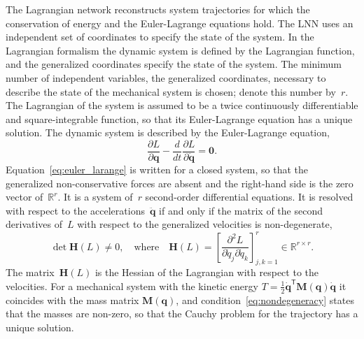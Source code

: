 \documentclass[sn-mathphys-num]{sn-jnl}
\theoremstyle{thmstylethree}
\theoremstyle{thmstyletwo}
\theoremstyle{thmstyleone}
\begin{document}
The Lagrangian network reconstructs system trajectories for which the conservation of energy and the Euler-Lagrange equations hold. The LNN uses an independent set of coordinates to specify the state of the system. In the Lagrangian formalism the dynamic system is defined by the Lagrangian function, and the generalized coordinates specify the state of the system. The minimum number of independent variables, the generalized coordinates, necessary to describe the state of the mechanical system is chosen; denote this number by~$r$. The Lagrangian of the system is assumed to be a twice continuously differentiable and square-integrable function, so that its Euler-Lagrange equation has a unique solution.
The dynamic system is described by the Euler-Lagrange equation,
\begin{equation}
\frac{\partial L}{\partial\mathbf{q}}-\frac{d}{dt}\frac{\partial L}{\partial\dot{\mathbf{q}}}=\mathbf{0}.
    \label{eq:euler_larange}
\end{equation}
Equation~\eqref{eq:euler_larange} is written for a closed system, so that the generalized non-conservative forces are absent and the right-hand side is the zero vector of~$\mathbb{R}^r$.
It is a system of~$r$ second-order differential equations. It is resolved with respect to the accelerations~$\ddot{\mathbf{q}}$ if and only if the matrix of the second derivatives of~$L$ with respect to the generalized velocities is non-degenerate,
\begin{equation}
\label{eq:nondegeneracy}
    \det \mathbf{H}(L) \neq 0,
    \quad\text{where}\quad
    \mathbf{H}(L) = \left[ \frac{\partial^{2} L}{\partial \dot{q}_{j}\partial \dot{q}_{k}} \right]_{j,k=1}^{r} \in \mathbb{R}^{r \times r}.
\end{equation}
The matrix~$\mathbf{H}(L)$ is the Hessian of the Lagrangian with respect to the velocities. For a mechanical system with the kinetic energy $T = \tfrac12 \dot{\mathbf{q}}^\mathsf{T} \mathbf{M}(\mathbf{q}) \dot{\mathbf{q}}$ it coincides with the mass matrix $\mathbf{M}(\mathbf{q})$, and condition~\eqref{eq:nondegeneracy} states that the masses are non-zero, so that the Cauchy problem for the trajectory has a unique solution.
\end{document}
